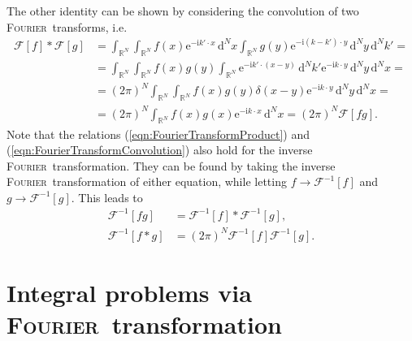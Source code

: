 \documentclass[german, parskip=full]{scrartcl}
\newcommand{\intr}{}
\newcommand{\I}{\text{i}}
\newcommand{\e}{\text{e}}
\newcommand*{\Fourier}{\textsc{Fourier}\ }
\newcommand*{\F}{\mathcal{F}}
\begin{document}
The other identity can be shown by considering the convolution of two \Fourier transforms, i.e.
\begin{align*}
\F[f]\ast\F[g]&=\intr\int_{\mathbb{R}^{N}}{\intr\int_{\mathbb{R}^{N}}{f(x)\e^{-\I k'\cdot x}}\,\mathrm{d}^{N}x}\intr\int_{\mathbb{R}^{N}}{g(y)\e^{-\I (k-k')\cdot y}}\,\mathrm{d}^{N}y\,\mathrm{d}^{N}k'=\\
&=\intr\int_{\mathbb{R}^{N}}\intr\int_{\mathbb{R}^{N}}{f(x)g(y)\intr\int_{\mathbb{R}^{N}}{\e^{-\I k'\cdot (x-y)}}\,\mathrm{d}^{N}k'}\e^{-\I k\cdot y}\,\mathrm{d}^{N}y\,\mathrm{d}^{N}x=\\
&=(2\pi)^N\intr\int_{\mathbb{R}^{N}}\intr\int_{\mathbb{R}^{N}}{f(x)g(y)\delta(x-y)}\e^{-\I k\cdot y}\,\mathrm{d}^{N}y\,\mathrm{d}^{N}x=\\
&=(2\pi)^N\intr\int_{\mathbb{R}^{N}}{f(x)g(x)}\e^{-\I k\cdot x}\,\mathrm{d}^{N}x=(2\pi)^N\F[fg].
\end{align*}
Note that the relations (\ref{eqn:FourierTransformProduct}) and (\ref{eqn:FourierTransformConvolution}) also hold for the inverse \Fourier transformation.
They can be found by taking the inverse \Fourier transformation of either equation, while letting $f\rightarrow \F^{-1}[f]$ and $g\rightarrow \F^{-1}[g]$.
This leads to
\begin{align}
\F^{-1}[fg]&=\F^{-1}[f]\ast\F^{-1}[g], \label{eqn:FourierTransformInverseProduct}\\
\F^{-1}[f\ast g]&=(2\pi)^N\F^{-1}[f]\F^{-1}[g]. \label{eqn:FourierTransformInverseConvolution}
\end{align}
\section{Integral problems via \Fourier transformation}
\end{document}

